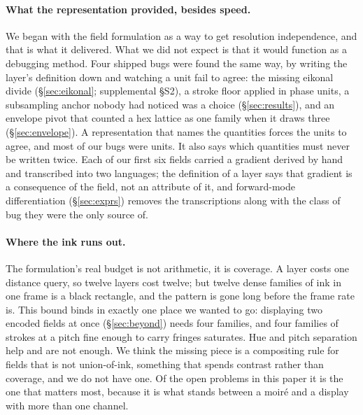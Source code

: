 \paragraph{What the representation provided, besides speed.}
We began with the field formulation as a way to get resolution independence, and
that is what it delivered. What we did not expect is that it would function as a
debugging method. Four shipped bugs were found the same way, by writing the
layer's definition down and watching a unit fail to agree: the missing eikonal
divide (\S\ref{sec:eikonal}; supplemental \S S2), a stroke floor applied in
phase units, a subsampling anchor nobody had noticed was a choice
(\S\ref{sec:results}), and an envelope pivot that counted a hex lattice as one
family when it draws three (\S\ref{sec:envelope}). A representation that names
the quantities forces the units to agree, and most of our bugs were units. It
also says which quantities must never be written twice. Each of our first six
fields carried a gradient derived by hand and transcribed into two languages;
the definition of a layer says that gradient is a consequence of the field, not
an attribute of it, and forward-mode differentiation (\S\ref{sec:exprs}) removes
the transcriptions along with the class of bug they were the only source of.

\paragraph{Where the ink runs out.}
The formulation's real budget is not arithmetic, it is coverage. A layer costs one
distance query, so twelve layers cost twelve; but twelve dense families of ink in
one frame is a black rectangle, and the pattern is gone long before the frame rate
is. This bound binds in exactly one place we wanted to go: displaying two encoded
fields at once (\S\ref{sec:beyond}) needs four families, and four families of
strokes at a pitch fine enough to carry fringes saturates. Hue and pitch separation
help and are not enough. We think the missing piece is a compositing rule for
fields that is not union-of-ink, something that spends contrast rather than
coverage, and we do not have one. Of the open problems in this paper it is the one that matters most, because it
is what stands between a moir\'e and a display with more than one channel.

